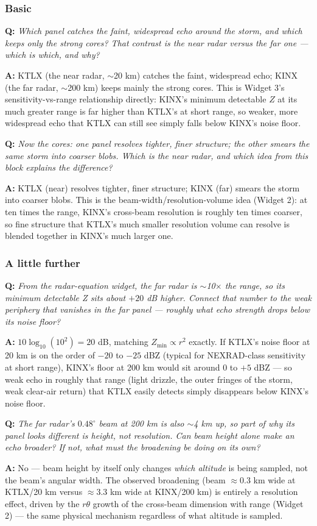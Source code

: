 \documentclass[11pt]{article}
\newenvironment{qa}[1]{\par\noindent\textbf{\color{qgray}Q: }\emph{#1}\par\noindent\textbf{A: }}{\par\vspace{6pt}}
\newcommand{\tier}[1]{\subsubsection*{#1}}
\begin{document}
\tier{Basic}
\begin{qa}{Which panel catches the faint, widespread echo around the storm, and which keeps only the strong cores? That contrast is the near radar versus the far one --- which is which, and why?}
KTLX (the near radar, $\sim$20 km) catches the faint, widespread echo; KINX (the far radar, $\sim$200 km) keeps mainly the strong cores. This is Widget 3's sensitivity-vs-range relationship directly: KINX's minimum detectable $Z$ at its much greater range is far higher than KTLX's at short range, so weaker, more widespread echo that KTLX can still see simply falls below KINX's noise floor.
\end{qa}
\begin{qa}{Now the cores: one panel resolves tighter, finer structure; the other smears the same storm into coarser blobs. Which is the near radar, and which idea from this block explains the difference?}
KTLX (near) resolves tighter, finer structure; KINX (far) smears the storm into coarser blobs. This is the beam-width/resolution-volume idea (Widget 2): at ten times the range, KINX's cross-beam resolution is roughly ten times coarser, so fine structure that KTLX's much smaller resolution volume can resolve is blended together in KINX's much larger one.
\end{qa}

\tier{A little further}
\begin{qa}{From the radar-equation widget, the far radar is $\sim$10$\times$ the range, so its minimum detectable Z sits about $+20$ dB higher. Connect that number to the weak periphery that vanishes in the far panel --- roughly what echo strength drops below its noise floor?}
$10\log_{10}(10^2)=20$ dB, matching $Z_{\min}\propto r^2$ exactly. If KTLX's noise floor at 20 km is on the order of $-20$ to $-25$ dBZ (typical for NEXRAD-class sensitivity at short range), KINX's floor at 200 km would sit around $0$ to $+5$ dBZ --- so weak echo in roughly that range (light drizzle, the outer fringes of the storm, weak clear-air return) that KTLX easily detects simply disappears below KINX's noise floor.
\end{qa}
\begin{qa}{The far radar's $0.48^\circ$ beam at 200 km is also $\sim$4 km up, so part of why its panel looks different is height, not resolution. Can beam height alone make an echo \emph{broader}? If not, what must the broadening be doing on its own?}
No --- beam height by itself only changes \emph{which altitude} is being sampled, not the beam's angular width. The observed broadening (beam $\approx$0.3 km wide at KTLX/20 km versus $\approx$3.3 km wide at KINX/200 km) is entirely a resolution effect, driven by the $r\theta$ growth of the cross-beam dimension with range (Widget 2) --- the same physical mechanism regardless of what altitude is sampled.
\end{qa}
\end{document}

